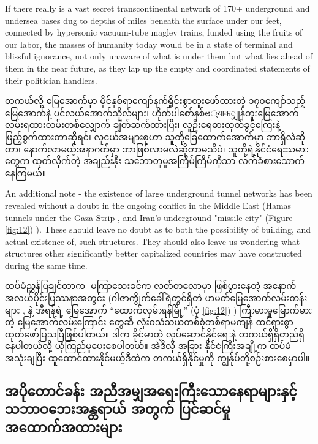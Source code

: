 \documentclass[10pt,twocolumn,letterpaper]{article}
\begin{document}
If there really is a vast secret transcontinental network of 170+ underground and undersea bases dug to depths of miles beneath the surface under our feet, connected by hypersonic vacuum-tube maglev trains, funded using the fruits of our labor, the masses of humanity today would be in a state of terminal and blissful ignorance, not only unaware of what is under them but what lies ahead of them in the near future, as they lap up the empty and coordinated statements of their politician handlers.

တကယ်လို့ မြေအောက်မှာ မိုင်နှစ်ရာကျော်နက်ရှိုင်းစွာတူးဖော်ထားတဲ့ ၁၇၀ကျော်သည့် မြေအောက်နဲ့ ပင်လယ်အောက်သိုလ်များ၊ ဟိုက်ပါစော်နစ်ဗ्याकျှုန်တူးမြေအောက်လမ်းရထားလမ်းတစ်လျှောက် ချိတ်ဆက်ထားပြီး၊ လူဦးရေဓားထုတ်ခွင့်ကြေးနဲ့ ဖြည့်စွက်ထားတာဆိုရင်၊ လူငယ်အများစုဟာ သူတို့ခြေထောက်အောက်မှာ ဘာရှိလဲဆိုတာ၊ နောက်လာမယ့်အနာဂတ်မှာ ဘာဖြစ်လာမလဲဆိုတာမသိပဲ၊ သူတို့ရဲ့နိုင်ငံရေးသမားတွေက ထုတ်လိုက်တဲ့ အချည်းနှီး သဘောတူမှုအကြိမ်ကြိမ်ကိုသာ လက်ခံစားသောက်နေကြမယ်။

An additional note - the existence of large underground tunnel networks has been revealed without a doubt in the ongoing conflict in the Middle East (Hamas tunnels under the Gaza Strip \cite{38}, and Iran's underground "missile city" (Figure \ref{fig:12}) \cite{39,40}). These should leave no doubt as to both the possibility of building, and actual existence of, such structures. They should also leave us wondering what structures other significantly better capitalized countries may have constructed during the same time.

ထပ်မံညွှန်ပြချင်တာက- မကြာသေးခင်က လတ်တလောမှာ ဖြစ်ပွားနေတဲ့ အနောက်အလယ်ပိုင်းပြဿနာအတွင်း (ဂါဇာကွိုက်ခေါ်ရဲတွင်ရှိတဲ့ ဟမတ်မြေအောက်လမ်းတန်းများ \cite{38}, နဲ့ အီရန်ရဲ့ မြေအောက် “ထောက်လှမ်းရန်မြို့” (ပုံ \ref{fig:12}) \cite{39,40}) ကြီးမားမှုမြောက်မားတဲ့ မြေအောက်လမ်းကြောင်း တွေဆီ လုံးဝသံသယတစ်စုံတစ်ရာမကျန် ထင်ရှားစွာ ထုတ်ဖော်ပြသပြီဖြစ်ပါတယ်။ ဒါက ခိုင်မာတဲ့ လုပ်ဆောင်နိုင်ရေးနဲ့ တကယ်ရှိရှိတည်ရှိနေပါတယ်လို့ ယုံကြည်မှုပေးစေပါတယ်။ အဲဒီလို အခြား နိုင်ငံကြီးအချို့က ထပ်မံအသုံးချပြီး ထူထောင်ထားနိုင်မယ့်ဒီထဲက တကယ်ရှိနိုင်မှုကို ကျွန်ုပ်တို့စဉ်းစားစေမှာပါ။

\subsection{အပိုတောင်ခန်း အညီအမျှအရေးကြီးသောနေရာများနှင့် သဘာဝဘေးအန္တရာယ် အတွက် ပြင်ဆင်မှုအထောက်အထားများ}
\end{document}
